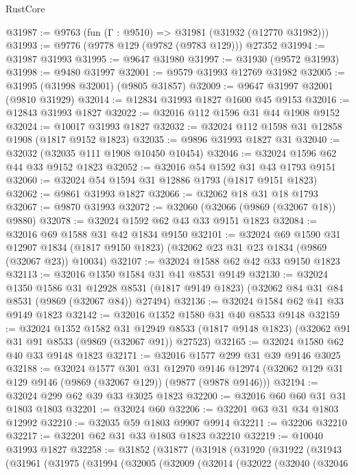 \begin{lexlean}{RustCore}
\begin{coremodule}
@31987 := @9763 (fun (Γ : @9510) => @31981 (@31932 (@12770 @31982)))
@31993 := @9776 (@9778 @129 (@9782 (@9783 @129))) @27352
@31994 := @31987 @31993
@31995 := @9647 @31980
@31997 := @31930 (@9572 @31993)
@31998 := @9480 @31997
@32001 := @9579 @31993 @12769 @31982
@32005 := @31995 (@31998 @32001) (@9805 @31857)
@32009 := @9647 @31997 @32001 (@9810 @31929)
@32014 := @12834 @31993 @1827 @1600 @45 @9153
@32016 := @12843 @31993 @1827
@32022 := @32016 @112 @1596 @31 @44 @1908 @9152
@32024 := @10017 @31993 @1827
@32032 := @32024 @112 @1598 @31 @12858 @1908 (@1817 @9152 @1823)
@32035 := @9896 @31993 @1827 @31
@32040 := @32032 (@32035 @111 @1908 @10450 @10454)
@32046 := @32024 @1596 @62 @44 @33 @9152 @1823
@32052 := @32016 @54 @1592 @31 @43 @1793 @9151
@32060 := @32024 @54 @1594 @31 @12886 @1793 (@1817 @9151 @1823)
@32062 := @9861 @31993 @1827
@32066 := @32062 @18 @31 @18 @1793
@32067 := @9870 @31993
@32072 := @32060 (@32066 (@9869 (@32067 @18)) @9880)
@32078 := @32024 @1592 @62 @43 @33 @9151 @1823
@32084 := @32016 @69 @1588 @31 @42 @1834 @9150
@32101 := @32024
    @69
    @1590
    @31
    @12907
    @1834
    (@1817 @9150 @1823)
    (@32062 @23 @31 @23 @1834 (@9869 (@32067 @23)) @10034)
@32107 := @32024 @1588 @62 @42 @33 @9150 @1823
@32113 := @32016 @1350 @1584 @31 @41 @8531 @9149
@32130 := @32024
    @1350
    @1586
    @31
    @12928
    @8531
    (@1817 @9149 @1823)
    (@32062 @84 @31 @84 @8531 (@9869 (@32067 @84)) @27494)
@32136 := @32024 @1584 @62 @41 @33 @9149 @1823
@32142 := @32016 @1352 @1580 @31 @40 @8533 @9148
@32159 := @32024
    @1352
    @1582
    @31
    @12949
    @8533
    (@1817 @9148 @1823)
    (@32062 @91 @31 @91 @8533 (@9869 (@32067 @91)) @27523)
@32165 := @32024 @1580 @62 @40 @33 @9148 @1823
@32171 := @32016 @1577 @299 @31 @39 @9146 @3025
@32188 := @32024
    @1577
    @301
    @31
    @12970
    @9146
    @12974
    (@32062 @129 @31 @129 @9146 (@9869 (@32067 @129)) (@9877 (@9878 @9146)))
@32194 := @32024 @299 @62 @39 @33 @3025 @1823
@32200 := @32016 @60 @60 @31 @31 @1803 @1803
@32201 := @32024 @60
@32206 := @32201 @63 @31 @34 @1803 @12992
@32210 := @32035 @59 @1803 @9907 @9914
@32211 := @32206 @32210
@32217 := @32201 @62 @31 @33 @1803 @1823 @32210
@32219 := @10040 @31993 @1827
@32258 := @31852
    (@31877
      (@31918
        (@31920
          (@31922
            (@31943
              (@31961
                (@31975
                  (@31994
                    (@32005
                      (@32009
                        (@32014
                          (@32022
                            (@32040
                              (@32046

\end{coremodule}
\end{lexlean}
